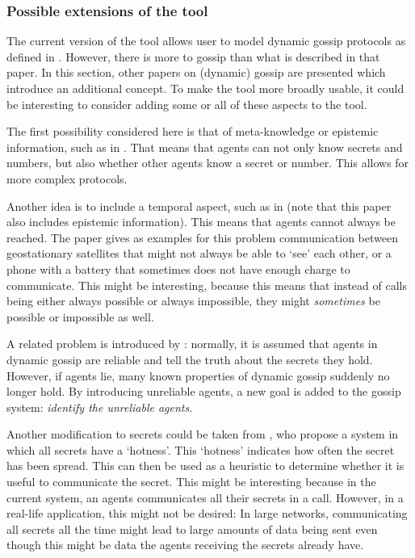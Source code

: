 \subsubsection{Possible extensions of the tool}

The current version of the tool allows user to model dynamic gossip protocols as defined in \textcite{van_ditmarsch_dynamic_2018}.
However, there is more to gossip than what is described in that paper.
In this section, other papers on (dynamic) gossip are presented which introduce an additional concept.
To make the tool more broadly usable, it could be interesting to consider adding some or all of these aspects to the tool.

The first possibility considered here is that of meta-knowledge or epistemic information, such as in \textcite{herzig_how_2017}.
That means that agents can not only know secrets and numbers, 
but also whether other agents know a secret or number.
This allows for more complex protocols.

Another idea is to include a temporal aspect, such as in \textcite{slavkovik_temporal_2019}
(note that this paper also includes epistemic information).
This means that agents cannot always be reached.
The paper gives as examples for this problem communication between geostationary satellites that might not always be able to `see' each other,
or a phone with a battery that sometimes does not have enough charge to communicate.
This might be interesting, because this means that instead of calls being either always possible or always impossible, 
they might \textit{sometimes} be possible or impossible as well.

A related problem is introduced by \textcite{van_den_berg_unreliable_2018}: 
normally, it is assumed that agents in dynamic gossip are reliable and tell the truth about the secrets they hold.
However, if agents lie, many known properties of dynamic gossip suddenly no longer hold.
By introducing unreliable agents, a new goal is added to the gossip system:
\textit{identify the unreliable agents}.

Another modification to secrets could be taken from \textcite{demers_epidemic_1988}, who propose a system in which all secrets have a `hotness'.
This `hotness' indicates how often the secret has been spread.
This can then be used as a heuristic to determine whether it is useful to communicate the secret.
This might be interesting because in the current system, an agents communicates all their secrets in a call.
However, in a real-life application, this might not be desired:
In large networks, communicating all secrets all the time might lead to large amounts of data being sent even though this might be data the agents receiving the secrets already have.

